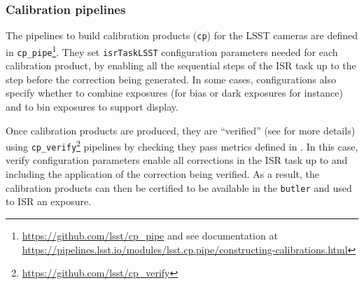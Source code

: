 \subsubsection{Calibration pipelines}
\label{sec:calib_pipe}

The pipelines to build calibration products (\texttt{cp}) for the LSST cameras are defined in \texttt{cp\_pipe}\footnote{\url{https://github.com/lsst/cp\_pipe} and see documentation at \url{https://pipelines.lsst.io/modules/lsst.cp.pipe/constructing-calibrations.html}}.
They set \texttt{isrTaskLSST} configuration parameters needed for each calibration product, by enabling all the sequential steps of the ISR task up to the step before the correction being generated. In some cases, configurations also specify whether to combine exposures (for bias or dark exposures for instance) and to bin exposures to support display.

Once calibration products are produced, they are ``verified'' (see \citet{DMTN-222} for more details) using \texttt{cp\_verify}\footnote{\url{https://github.com/lsst/cp\_verify}} pipelines by checking they pass metrics defined in \citet{DMTN-101}.
In this case, verify configuration parameters enable all corrections in the ISR task up to and including the application of the correction being verified. As a result, the calibration products can then be certified to be available in the \texttt{butler} and used to ISR an exposure.
